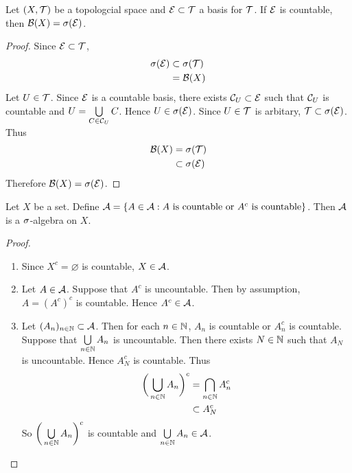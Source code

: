 \documentclass{book}
\begin{document}
	\begin{ex}
		Let $(X, \mathcal{T})$ be a topologcial space and $\mathcal{E} \subset \mathcal{T}$ a basis for $\mathcal{T}$. If $\mathcal{E}$ is countable, then $\mathcal{B}(X) = \sigma(\mathcal{E})$.  
	\end{ex}

	\begin{proof}
		Since $\mathcal{E} \subset \mathcal{T}$, 
		\begin{align*}
			\sigma(\mathcal{E})
			& \subset \sigma(\mathcal{T}) \\
			& = \mathcal{B}(X)
		\end{align*}
		Let $U \in \mathcal{T}$. Since $\mathcal{E}$ is a countable basis, there exists $\mathcal{C}_U \subset \mathcal{E}$ such that $\mathcal{C}_U$ is countable and $U = \bigcup\limits_{C \in \mathcal{C}_U}C$. Hence $U \in \sigma(\mathcal{E})$. Since $U \in \mathcal{T}$ is arbitary, $\mathcal{T} \subset \sigma(\mathcal{E})$. Thus 
		\begin{align*}
			\mathcal{B}(X) 
			& = \sigma(\mathcal{T}) \\
			& \subset \sigma(\mathcal{E})
		\end{align*} 
		Therefore $\mathcal{B}(X) = \sigma(\mathcal{E})$.
	\end{proof}
	
	\begin{ex}  
		Let $X$ be a set. Define $\mathcal{A} = \{A \in \mathcal{A}: A \text{ is countable or }A^c  \text{ is countable}\}$. Then $\mathcal{A}$ is a $\sigma$-algebra on $X$.
	\end{ex}
	
	\begin{proof}\
		\begin{enumerate}
			\item Since $X^c = \varnothing$ is countable, $X \in \mathcal{A}$.
			\item Let $A \in \mathcal{A}$. Suppose that $A^c$ is  uncountable. Then by assumption, $A = (A^c)^c$ is countable. Hence $A^c \in \mathcal{A}$.
			\item Let $(A_n)_{n \in \mathbb{N}} \subset \mathcal{A}$. Then for each $n \in \mathbb{N}$, $A_n$ is countable or $A_n^c$ is countable. Suppose that $\bigcup\limits_{n \in \mathbb{N}}A_n$ is uncountable. Then there exists $N \in \mathbb{N}$ such that $A_N$ is uncountable. Hence $A_N^c$ is countable. Thus 
			\begin{align*}
				\bigg(\bigcup_{n \in \mathbb{N}}A_n \bigg)^c 
				&= \bigcap_{n \in \mathbb{N}}A_n^c \\
				& \subset A_N^c 
			\end{align*}
			So $\bigg(\bigcup\limits_{n \in \mathbb{N}}A_n \bigg)^c $ is countable and $\bigcup\limits_{n \in \mathbb{N}}A_n \in \mathcal{A}$. 
		\end{enumerate}
	\end{proof}
\end{document}
